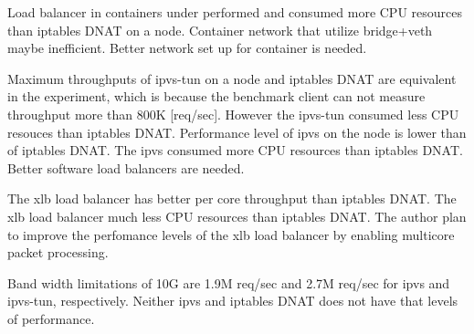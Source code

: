 Load balancer in containers under performed and consumed more CPU resources than iptables DNAT on a node.
Container network that utilize bridge+veth maybe inefficient.
Better network set up for container is needed.

Maximum throughputs of ipvs-tun on a node and iptables DNAT are equivalent in the experiment, which is because the benchmark client can not measure throughput more than 800K [req/sec].
However the ipvs-tun consumed less CPU resouces than iptables DNAT.
Performance level of ipvs on the node is lower than of iptables DNAT.
The ipvs consumed more CPU resources than iptables DNAT.
Better software load balancers are needed.

The xlb load balancer has better per core throughput than iptables DNAT.
The xlb load balancer much less CPU resources than iptables DNAT.
The author plan to improve the perfomance levels of the xlb load balancer by enabling multicore packet processing. 


Band width limitations of 10G are 1.9M req/sec and 2.7M req/sec for ipvs and ipvs-tun, respectively.
Neither ipvs and iptables DNAT does not have that levels of performance. 

